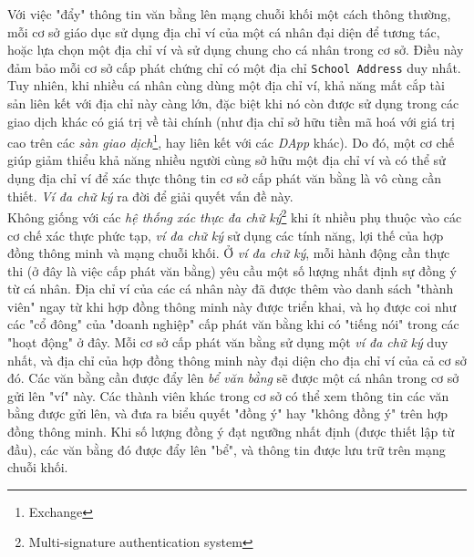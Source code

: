 Với việc "đẩy" thông tin văn bằng lên mạng chuỗi khối một cách thông thường, mỗi cơ sở giáo dục sử dụng địa chỉ ví của một cá nhân đại diện để tương tác, hoặc lựa chọn một địa chỉ ví và sử dụng chung cho cá nhân trong cơ sở. Điều này đảm bảo mỗi cơ sở cấp phát chứng chỉ có một địa chỉ \texttt{School Address} duy nhất. Tuy nhiên, khi nhiều cá nhân cùng dùng một địa chỉ ví, khả năng mất cắp tài sản liên kết với địa chỉ này càng lớn, đặc biệt khi nó còn được sử dụng trong các giao dịch khác có giá trị về tài chính (như địa chỉ sở hữu tiền mã hoá với giá trị cao trên các \textit{sàn giao dịch}\footnote{Exchange}, hay liên kết với các \textit{DApp} khác). Do đó, một cơ chế giúp giảm thiểu khả năng nhiều người cùng sở hữu một địa chỉ ví và có thể sử dụng địa chỉ ví để xác thực thông tin cơ sở cấp phát văn bằng là vô cùng cần thiết. \textit{Ví đa chữ ký} ra đời để giải quyết vấn đề này.\\

Không giống với các \textit{hệ thống xác thực đa chữ ký}\footnote{Multi-signature authentication system} khi ít nhiều phụ thuộc vào các cơ chế xác thực phức tạp, \textit{ví đa chữ ký} sử dụng các tính năng, lợi thế của hợp đồng thông minh và mạng chuỗi khối. Ở \textit{ví đa chữ ký}, mỗi hành động cần thực thi (ở đây là việc cấp phát văn bằng) yêu cầu một số lượng nhất định sự đồng ý từ cá nhân. Địa chỉ ví của các cá nhân này đã được thêm vào danh sách "thành viên" ngay từ khi hợp đồng thông minh này được triển khai, và họ được coi như các "cổ đông" của "doanh nghiệp" cấp phát văn bằng khi có "tiếng nói" trong các "hoạt động" ở đây. Mỗi cơ sở cấp phát văn bằng sử dụng một \textit{ví đa chữ ký} duy nhất, và địa chỉ của hợp đồng thông minh này đại diện cho địa chỉ ví của cả cơ sở đó. Các văn bằng cần được đẩy lên \textit{bể văn bằng} sẽ được một cá nhân trong cơ sở gửi lên "ví" này. Các thành viên khác trong cơ sở có thể xem thông tin các văn bằng được gửi lên, và đưa ra biểu quyết "đồng ý" hay "không đồng ý" trên hợp đồng thông minh. Khi số lượng đồng ý đạt ngưỡng nhất định (được thiết lập từ đầu), các văn bằng đó được đẩy lên "bể", và thông tin được lưu trữ trên mạng chuỗi khối.\\

